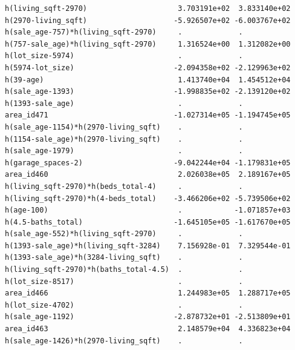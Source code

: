 \documentclass[
]{article}
\begin{document}
\begin{verbatim}
h(living_sqft-2970)                     3.703191e+02  3.833140e+02
h(2970-living_sqft)                    -5.926507e+02 -6.003767e+02
h(sale_age-757)*h(living_sqft-2970)     .             .           
h(757-sale_age)*h(living_sqft-2970)     1.316524e+00  1.312082e+00
h(lot_size-5974)                        .             .           
h(5974-lot_size)                       -2.094358e+02 -2.129963e+02
h(39-age)                               1.413740e+04  1.454512e+04
h(sale_age-1393)                       -1.998835e+02 -2.139120e+02
h(1393-sale_age)                        .             .           
area_id471                             -1.027314e+05 -1.194745e+05
h(sale_age-1154)*h(2970-living_sqft)    .             .           
h(1154-sale_age)*h(2970-living_sqft)    .             .           
h(sale_age-1979)                        .             .           
h(garage_spaces-2)                     -9.042244e+04 -1.179831e+05
area_id460                              2.026038e+05  2.189167e+05
h(living_sqft-2970)*h(beds_total-4)     .             .           
h(living_sqft-2970)*h(4-beds_total)    -3.466206e+02 -5.739506e+02
h(age-100)                              .            -1.071857e+03
h(4.5-baths_total)                     -1.645105e+05 -1.617670e+05
h(sale_age-552)*h(living_sqft-2970)     .             .           
h(1393-sale_age)*h(living_sqft-3284)    7.156928e-01  7.329544e-01
h(1393-sale_age)*h(3284-living_sqft)    .             .           
h(living_sqft-2970)*h(baths_total-4.5)  .             .           
h(lot_size-8517)                        .             .           
area_id466                              1.244983e+05  1.288717e+05
h(lot_size-4702)                        .             .           
h(sale_age-1192)                       -2.878732e+01 -2.513809e+01
area_id463                              2.148579e+04  4.336823e+04
h(sale_age-1426)*h(2970-living_sqft)    .             .           
                                                                  

\end{verbatim}
\end{document}
